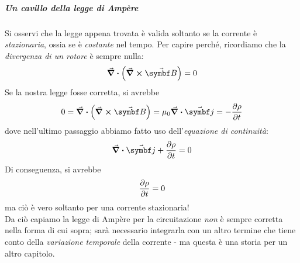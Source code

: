 \subparagraph{Un cavillo della legge di Ampère}
Si osservi che la legge appena trovata è valida soltanto se la corrente è \textit{stazionaria}, ossia se è \textit{costante} nel tempo. Per capire perché, ricordiamo che la \textit{divergenza di un rotore} è sempre nulla:\label{laleggediAmpereèfalsaepretenziosa}
\begin{equation*}
	\div{\left(\curl{\vba{B}}\right)}=0
\end{equation*}
Se la nostra legge fosse corretta, si avrebbe
\begin{equation*}
	0=\div{\left(\curl{\vba{B}}\right)}=\mu_0\div{\vba{j}}=-\pdv{\rho}{t}
\end{equation*}
dove nell'ultimo passaggio abbiamo fatto uso dell'\textit{equazione di continuità}:
\begin{equation*}
	\div{\vba{j}}+\pdv{\rho}{t}=0
\end{equation*}
Di conseguenza, si avrebbe
\begin{equation*}
	\pdv{\rho}{t}=0
\end{equation*}
ma ciò è vero soltanto per una corrente stazionaria!\\
Da ciò capiamo la legge di Ampère per la circuitazione \textit{non} è sempre corretta nella forma di cui sopra; sarà necessario integrarla con un altro termine che tiene conto della \textit{variazione temporale} della corrente - ma questa è una storia per un altro capitolo.
